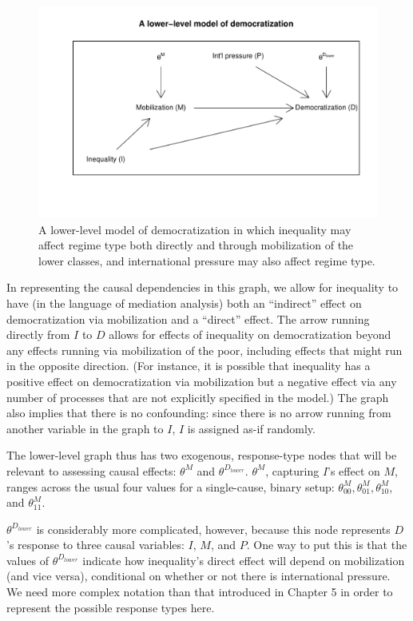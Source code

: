 \documentclass[
  12pt,
]{book}
\begin{document}
\begin{figure}

{\centering \includegraphics[width=.7\textwidth]{ii_files/figure-latex/lowdem-1} 

}

\caption{\label{fig:lowdem} A lower-level model of democratization in which inequality may affect regime type both directly and through mobilization of the lower classes, and international pressure may also affect regime type.}\label{fig:lowdem}
\end{figure}

In representing the causal dependencies in this graph, we allow for inequality to have (in the language of mediation analysis) both an ``indirect'' effect on democratization via mobilization and a ``direct'' effect. The arrow running directly from \(I\) to \(D\) allows for effects of inequality on democratization beyond any effects running via mobilization of the poor, including effects that might run in the opposite direction. (For instance, it is possible that inequality has a positive effect on democratization via mobilization but a negative effect via any number of processes that are not explicitly specified in the model.) The graph also implies that there is no confounding: since there is no arrow running from another variable in the graph to \(I\), \(I\) is assigned as-if randomly.

The lower-level graph thus has two exogenous, response-type nodes that will be relevant to assessing causal effects: \(\theta^M\) and \(\theta^{D_{lower}}\). \(\theta^M\), capturing \(I\)'s effect on \(M\), ranges across the usual four values for a single-cause, binary setup: \(\theta_{00}^M, \theta_{01}^M, \theta_{10}^M\), and \(\theta_{11}^M\).

\(\theta^{D_{lower}}\) is considerably more complicated, however, because this node represents \(D\)'s response to three causal variables: \(I\), \(M\), and \(P\). One way to put this is that the values of \(\theta^{D_{lower}}\) indicate how inequality's direct effect will depend on mobilization (and vice versa), conditional on whether or not there is international pressure. We need more complex notation than that introduced in Chapter 5 in order to represent the possible response types here.
\end{document}
